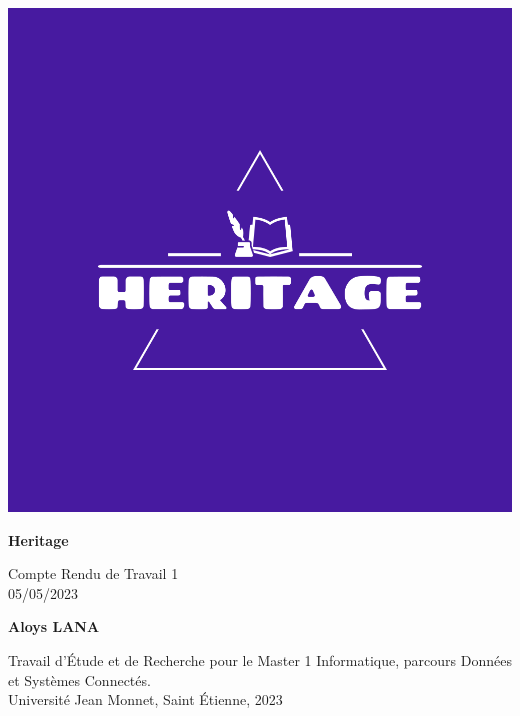 \documentclass[a4paper, 12pt]{article}
\begin{document}
    \begin{titlepage}
        \begin{center}
            \vspace*{1cm}

            \includegraphics[scale=0.07]{../../exigences/png/logo-color.png}

            \vspace{0.8cm}
            \Huge
            \textbf{Heritage}

            \vspace{0.5cm}
            \LARGE
            Compte Rendu de Travail 1 \\
            05/05/2023

            \vspace{1.5cm}

            \textbf{Aloys LANA}

            \vfill
            \Large
            Travail d'Étude et de Recherche pour le Master 1 Informatique, parcours Données et Systèmes
            Connectés.\\

            \vspace{1cm}
            \large
            Université Jean Monnet, Saint Étienne, 2023
        \end{center}
    \end{titlepage}
\end{document}
